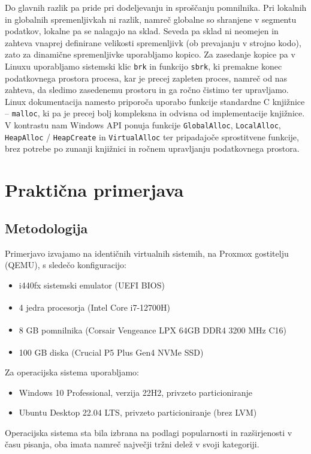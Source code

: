 \documentclass[a4paper,12pt,openright]{book}
\begin{document}
Do glavnih razlik pa pride pri dodeljevanju in sproščanju pomnilnika. Pri lokalnih in globalnih spremenljivkah ni razlik, namreč globalne so shranjene v segmentu podatkov, lokalne pa se nalagajo na sklad.
Seveda pa sklad ni neomejen in zahteva vnaprej definirane velikosti spremenljivk (ob prevajanju v strojno kodo), zato za dinamične spremenljivke uporabljamo kopico.
Za zasedanje kopice pa v Linuxu uporabljamo sistemski klic \verb|brk| in funkcijo \verb|sbrk|, ki premakne konec podatkovnega prostora procesa, kar je precej zapleten proces, namreč od nas zahteva, da sledimo zasedenemu prostoru in ga ročno čistimo ter upravljamo. Linux dokumentacija namesto priporoča uporabo funkcije standardne C knjižnice -- \verb|malloc|, ki pa je precej bolj kompleksna in odvisna od implementacije knjižnice.
V kontrastu nam Windows API ponuja funkcije \verb|GlobalAlloc|, \verb|LocalAlloc|, \verb|HeapAlloc| / \verb|HeapCreate| in \verb|VirtualAlloc| ter pripadajoče sprostitvene funkcije, brez potrebe po zunanji knjižnici in ročnem upravljanju podatkovnega prostora.

\section{Praktična primerjava}

\subsection{Metodologija} \label{ssec:process_control:methodology}

Primerjavo izvajamo na identičnih virtualnih sistemih, na Proxmox gostitelju (QEMU), s sledečo konfiguracijo:
\begin{itemize}
	\item i440fx sistemski emulator (UEFI BIOS)
	\item 4 jedra procesorja (Intel\textsuperscript{\textregistered} Core\textsuperscript{\texttrademark} i7-12700H)
	\item 8 GB pomnilnika (Corsair\textsuperscript{\textregistered} Vengeance\textsuperscript{\textregistered} LPX 64GB DDR4 3200 MHz C16)
	\item 100 GB diska (Crucial\textsuperscript{\textregistered} P5 Plus Gen4 NVMe SSD)
\end{itemize}

Za operacijska sistema uporabljamo:
\begin{itemize}
	\item Windows 10 Professional, verzija 22H2, privzeto particioniranje
	\item Ubuntu Desktop 22.04 LTS, privzeto particioniranje (brez LVM)
\end{itemize}
Operacijska sistema sta bila izbrana na podlagi popularnosti in razširjenosti v času pisanja, oba imata namreč največji tržni delež v svoji kategoriji.
\end{document}
